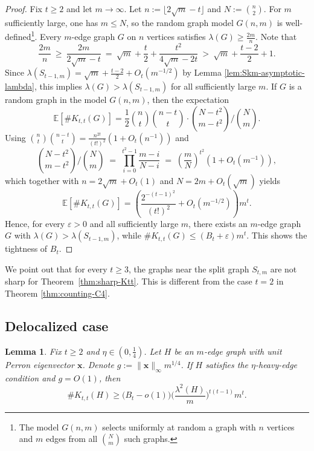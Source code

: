 \documentclass[10pt,a4paper]{amsart}
\newtheorem{lemma}[theorem]{Lemma}
\newcommand{\Ktt}{K_{t,t}}
\begin{document}
\begin{proof} 
Fix $t\ge 2$ and let $m\to\infty$.
Let $n:=\lfloor 2\sqrt m-t\rfloor$ and $N:=\binom n2$.
For $m$ sufficiently large, one has $m\le N$, so the random graph model $G(n,m)$ is well-defined\footnote{The model $G(n,m)$ selects uniformly at random a graph with $n$ vertices and $m$ edges from all $\binom{N}{m}$ such graphs.}.
Every $m$-edge graph $G$ on $n$ vertices satisfies $\lambda(G)\ge \frac{2m}{n}$. Note that  
\[
  \frac{2m}{n}
  \ \ge\
  \frac{2m}{2\sqrt m-t}
  \ =\
  \sqrt m+\frac{t}{2}+\frac{t^2}{4\sqrt m-2t}
  \ > \
  \sqrt m+\frac{t-2}{2}+1.
\]
Since $\lambda(S_{t-1,m})=\sqrt m+\frac{t-2}{2}+O_t(m^{-1/2})$ by Lemma \ref{lem:Skm-asymptotic-lambda}, this implies $\lambda(G)>\lambda(S_{t-1,m})$ for all sufficiently
large $m$.
If $G$ is a random graph in the model $G(n,m)$, then the expectation 
\[
\mathbb E[\texttt{\#}\Ktt(G)]
  = 
  \frac12\binom nt\binom{n-t}{t}
  \cdot
  {\binom{N-t^2}{m-t^2}}\bigg/ {\binom{N}{m}}. 
\]
Using $\binom nt\binom{n-t}{t}=\frac{n^{2t}}{(t!)^2}\left(1+O_t(n^{-1})\right)$ and 
\[
  {\binom{N-t^2}{m-t^2}} \bigg/ {\binom{N}{m}}
  \;=\;
  \prod_{i=0}^{t^2-1}\frac{m-i}{N-i}
  \;=\;
  \left(\frac{m}{N}\right)^{t^2}\left(1+O_t(m^{-1})\right), 
\]
which together with $n=2\sqrt m+O_t(1)$ and
$N=2m+O_t(\sqrt m)$ yields 
\[
 \mathbb E[\texttt{\#}\Ktt(G)]
  =
  \left( \frac{2^{-(t-1)^2}}{(t!)^2}+O_t(m^{-1/2})\right)m^t. 
\]  
Hence, for every $\varepsilon>0$ and all sufficiently large $m$, there exists an $m$-edge graph $G$ with
$\lambda(G)>\lambda(S_{t-1,m})$, while $\texttt{\#}\Ktt(G)\le (B_t+\varepsilon)m^t$. This shows the tightness of $B_t$. 
\end{proof}

We point out that for every $t\ge 3$, the graphs near the split graph $S_{t,m}$ are not sharp for Theorem~\ref{thm:sharp-Ktt}.
This is different from the case $t=2$ in Theorem \ref{thm:counting-C4}. 


\subsection{Delocalized case}

\begin{lemma} \label{lem:lemmaB-delocalized}
Fix \(t\ge2\) and $\eta\in(0,\tfrac14)$. Let $H$ be an $m$-edge graph with unit Perron eigenvector \(\bm{x}\). Denote
$g:=\|\bm{x} \|_\infty m^{1/4}$. 
If \(H\) satisfies the \(\eta\)-heavy-edge condition and \(g=O(1)\), then
\[
 \texttt{\#}\Ktt(H)\ge \bigl(B_t-o(1)\bigr) \Big(\frac{\lambda^2(H)}{m}\Big)^{t(t-1)}m^t.
\]
\end{lemma}
\end{document}
